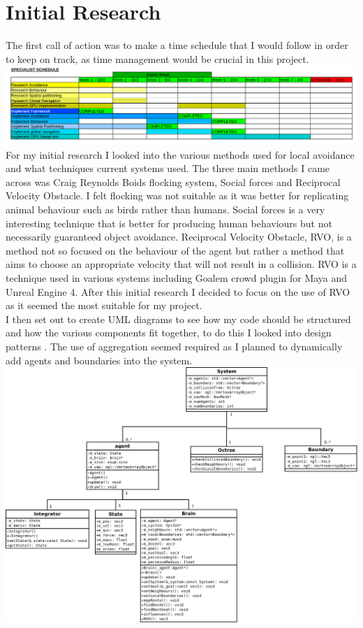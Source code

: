 \documentclass[a4paper,twocolumn]{article}
\begin{document}
\section{Initial Research}
The first call of action was to make a time schedule that I would follow in order to keep on track, as time management would be crucial in this project.
\label{schedule}
\includegraphics[scale=0.2]{../schedule/specialistSchedule.png}
For my initial research I looked into the various methods used for local avoidance and what techniques current systems used. The three main methods I came across was Craig Reynolds Boids flocking system, Social forces and Reciprocal Velocity Obstacle. I felt flocking was not suitable as it was better for replicating animal behaviour such as birds rather than humans. Social forces is a very interesting technique that is better for producing human behaviours but not necessarily guaranteed object avoidance. Reciprocal Velocity Obstacle, RVO, is a method not so focused on the behaviour of the agent but rather a method that aims to choose an appropriate velocity that will not result in a collision. RVO is a technique used in various systems including Goalem crowd plugin for Maya and Unreal Engine 4. After this initial research I decided to focus on the use of RVO as it seemed the most suitable for my project.\\
I then set out to create UML diagrams to see how my code should be structured and how the various components fit together, to do this I looked into design patterns \cite{OODPWS}. The use of aggregation seemed required as I planned to dynamically add agents and boundaries into the system.\\
\label{uml diagram}
\includegraphics[scale=0.13]{../umlDiagram/Agent_UML_diagram.png} 
\end{document}
